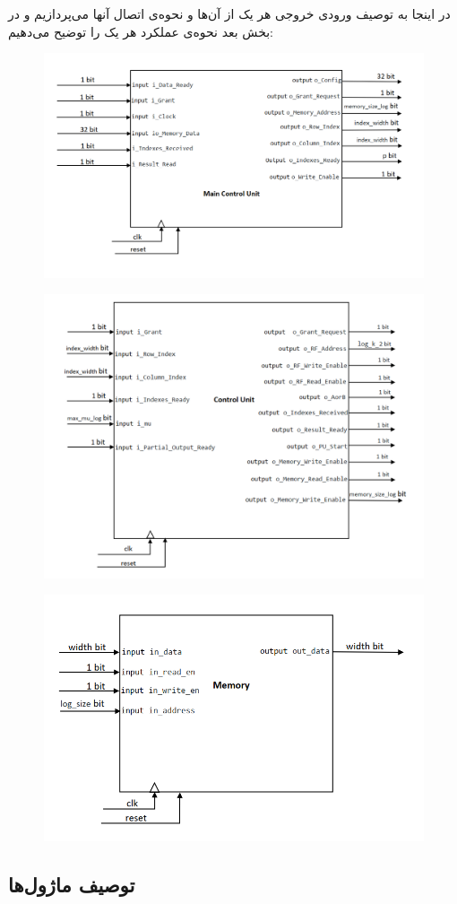 \documentclass[12pt,onecolumn,a4paper,fleqn]{article}
\begin{document}
	در اینجا به توصیف ورودی‌ خروجی‌ هر یک از آن‌ها و نحوه‌ی اتصال ‌آنها می‌پردازیم و در بخش بعد نحوه‌ی عملکرد هر یک را توضیح می‌دهیم:
	
\begin{figure}[h]
	\centering
	\includegraphics[width=0.5\linewidth]{source/main_cu.png}
	\caption{}
\end{figure}

\begin{figure}[h]
	\centering
	\includegraphics[width=0.5\linewidth]{source/ControlUnit.png}
	\caption{}
\end{figure}

\begin{figure}[h]
	\centering
	\includegraphics[width=0.5\linewidth]{source/Memory.png}
	\caption{}
\end{figure}
	
\subsection{توصیف ماژول‌ها}
\end{document}
